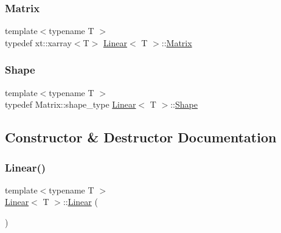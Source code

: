 \subsubsection{\texorpdfstring{Matrix}{Matrix}}
{\footnotesize\ttfamily template$<$typename T $>$ \\
typedef xt\+::xarray$<$T$>$ \mbox{\hyperlink{class_linear}{Linear}}$<$ T $>$\+::\mbox{\hyperlink{class_layer_a22b1e7286096aa62bd245536c8ebdaf1}{Matrix}}}

\mbox{\label{class_linear_afeccdcd7a158d0fe034436e4eafae066}} 
\subsubsection{\texorpdfstring{Shape}{Shape}}
{\footnotesize\ttfamily template$<$typename T $>$ \\
typedef Matrix\+::shape\+\_\+type \mbox{\hyperlink{class_linear}{Linear}}$<$ T $>$\+::\mbox{\hyperlink{class_layer_a8313f42d2292d12dd5d40cc115636693}{Shape}}}



\subsection{Constructor \& Destructor Documentation}
\mbox{\label{class_linear_a905089a6472d97cc8b1d201fdd3deef9}} 
\subsubsection{\texorpdfstring{Linear()}{Linear()}\hspace{0.1cm}{\footnotesize\ttfamily [1/2]}}
{\footnotesize\ttfamily template$<$typename T $>$ \\
\mbox{\hyperlink{class_linear}{Linear}}$<$ T $>$\+::\mbox{\hyperlink{class_linear}{Linear}} (\begin{DoxyParamCaption}{ }\end{DoxyParamCaption})\hspace{0.3cm}{\ttfamily [default]}}

\mbox{\label{class_linear_a42109067fe1d9da36148f7c4f330b564}} 
